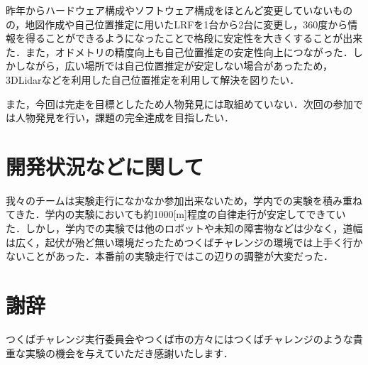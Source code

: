 \documentclass[10pt,a4paper]{jarticle}
\begin{document}
昨年からハードウェア構成やソフトウェア構成をほとんど変更していないものの，地図作成や自己位置推定に用いたLRFを1台から2台に変更し，360度から情報を得ることができるようになったことで格段に安定性を大きくすることが出来た．また，オドメトリの精度向上も自己位置推定の安定性向上につながった．しかしながら，広い場所では自己位置推定が安定しない場合があったため，3DLidarなどを利用した自己位置推定を利用して解決を図りたい．

また，今回は完走を目標としたため人物発見には取組めていない．次回の参加では人物発見を行い，課題の完全達成を目指したい．


\section{開発状況などに関して}
我々のチームは実験走行になかなか参加出来ないため，学内での実験を積み重ねてきた．学内の実験においても約1000[m]程度の自律走行が安定してできていた．しかし，学内での実験では他のロボットや未知の障害物などは少なく，道幅は広く，起伏が殆ど無い環境だったためつくばチャレンジの環境では上手く行かないことがあった．本番前の実験走行ではこの辺りの調整が大変だった．


\section*{謝辞}
つくばチャレンジ実行委員会やつくば市の方々にはつくばチャレンジのような貴重な実験の機会を与えていただき感謝いたします．



 

\end{document}

